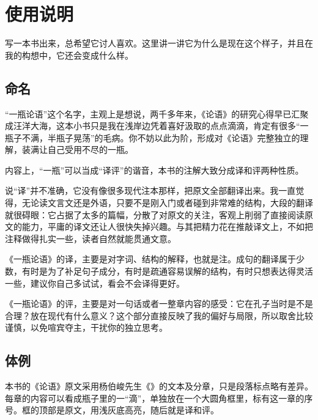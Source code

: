 \chapter*{使\quad 用\quad 说\quad 明}

写一本书出来，总希望它讨人喜欢。这里讲一讲它为什么是现在这个样子，并且在我的构想中，它还会变成什么样。


\lypdfbookmark\section*{命名}

“一瓶论语”这个名字，主观上是想说，两千多年来，《论语》的研究心得早已汇聚成汪洋大海，这本小书只是我在浅岸边凭着喜好汲取的点点滴滴，肯定有很多“一瓶子不满，半瓶子晃荡”的毛病。你不妨以此为阶，形成对《论语》完整独立的理解，装满让自己受用不尽的一瓶。

内容上，“一瓶”可以当成“译评”的谐音，本书的注解大致分成译和评两种性质。

说“译”并不准确，它没有像很多现代注本那样，把原文全部翻译出来。我一直觉得，无论读文言文还是外语，只要不是刚入门或者碰到非常难的结构，大段的翻译就很碍眼：它占据了太多的篇幅，分散了对原文的关注，客观上削弱了直接阅读原文的能力，平庸的译文还让人很快失掉兴趣。与其把精力花在推敲译文上，不如把注释做得扎实一些，读者自然就能贯通文意。

《一瓶论语》的译，主要是对字词、结构的解释，也就是注。成句的翻译属于少数，有时是为了补足句子成分，有时是疏通容易误解的结构，有时只想表达得灵活一些，建议你自己多试试，看会不会译得更好。

《一瓶论语》的评，主要是对一句话或者一整章内容的感受：它在孔子当时是不是合理？放在现代有什么意义？这个部分直接反映了我的偏好与局限，所以取舍比较谨慎，以免喧宾夺主，干扰你的独立思考。


\lypdfbookmark\section*{体例}

本书的《论语》原文采用杨伯峻先生《》的文本及分章，只是段落标点略有差异。每章的内容可以看成瓶子里的一“滴”，单独放在一个大圆角框里，标有这一章的序号。框的顶部是原文，用\colorbox{lytextbackground}{浅灰底}高亮，随后就是译和评。

